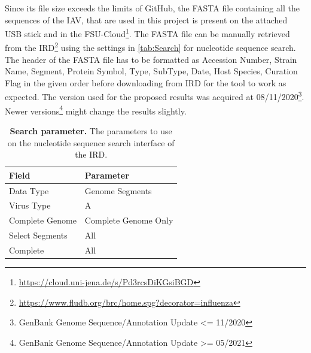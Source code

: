 Since its file size exceeds the limits of GitHub, the FASTA file containing all the sequences of the \gls{IAV}, that are used in this project is present on the attached USB stick and in the FSU-Cloud\footnote{\url{https://cloud.uni-jena.de/s/Pd3rcsDiKGsiBGD}}. The FASTA file can be manually retrieved from the \gls{IRD}\footnote{\url{https://www.fludb.org/brc/home.spg?decorator=influenza}} using the settings in \autoref{tab:Search} for nucleotide sequence search. The header of the FASTA file has to be formatted as Accession Number, Strain Name, Segment, Protein Symbol, Type, SubType, Date, Host Species, Curation Flag in the given order before downloading from \gls{IRD} for the tool to work as expected. The version used for the proposed results was acquired at 08/11/2020\footnote{GenBank Genome Sequence/Annotation Update <= 11/2020}. Newer versions\footnote{GenBank Genome Sequence/Annotation Update >= 05/2021} might change the results slightly.

\begin{table}[!hbt]
    \footnotesize
    \centering
    \caption[Search parameter]{\textbf{Search parameter.} The parameters to use on the nucleotide sequence search interface of the \gls{IRD}.}
    \label{tab:Search}
    \begin{tabular*}{0.5\textwidth}{@{\extracolsep{\fill}\hspace{6pt}}ll}
        \toprule
        \textbf{Field} & \textbf{Parameter}\\
        \midrule
        Data Type & Genome Segments\\
        Virus Type & A\\
        Complete Genome & Complete Genome Only\\
        Select Segments & All\\
        Complete & All\\
        \bottomrule
    \end{tabular*}
\end{table}

